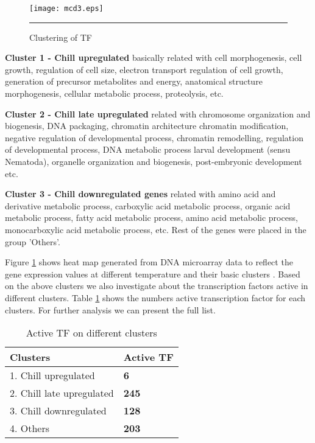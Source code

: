 \begin{figure}
	\centering
		\texttt{[image: mcd3.eps]}
		\rule{35em}{0.5pt}
	\caption[Clustering of TF]
		{Clustering of TF}
	\label{fig:Clustering_TF}
\end{figure}

\textbf{Cluster 1 - Chill upregulated} basically related with cell morphogenesis, cell growth, regulation of cell size, electron transport regulation of cell growth, generation of precursor metabolites and energy, anatomical structure morphogenesis, cellular metabolic process, proteolysis, etc.

\textbf{Cluster 2 - Chill late upregulated} related with chromosome organization and biogenesis, DNA packaging, chromatin architecture chromatin modification, negative regulation of developmental process, 
chromatin remodelling, regulation of developmental process, DNA metabolic process larval development (sensu Nematoda), organelle organization and biogenesis, post-embryonic development etc.

\textbf{Cluster 3 - Chill downregulated genes} related with amino acid and derivative metabolic process, carboxylic acid metabolic process, organic acid metabolic process, fatty acid metabolic process,
amino acid metabolic process, monocarboxylic acid metabolic process, etc.  Rest of the genes were placed in the group 'Others'. 

Figure \ref{fig:Clustering_TF} shows heat map generated from DNA microarray data to reflect the gene expression values at different temperature and their basic clusters \cite{Cossins:2007}. Based on the above clusters we also investigate about the transcription factors active in different clusters. Table \ref{table:Active_TF_diff_clusters} shows the numbers active transcription factor for each clusters.
For further analysis we can present the full list.


\begin{table}
  \centering
  \begin{tabular}{l l }
    \toprule
    \textbf{Clusters} & \textbf{Active TF} \\
    \midrule
    1. Chill upregulated & \bf 6 \\ 
    2. Chill late upregulated & \bf245 \\ 
    3. Chill downregulated & \bf128 \\
    4. Others & \bf 203 \\
  \bottomrule
  \end{tabular}
  \caption[Active TF on different clusters]
	  {Active TF on different clusters}
  \label{table:Active_TF_diff_clusters}
\end{table}

